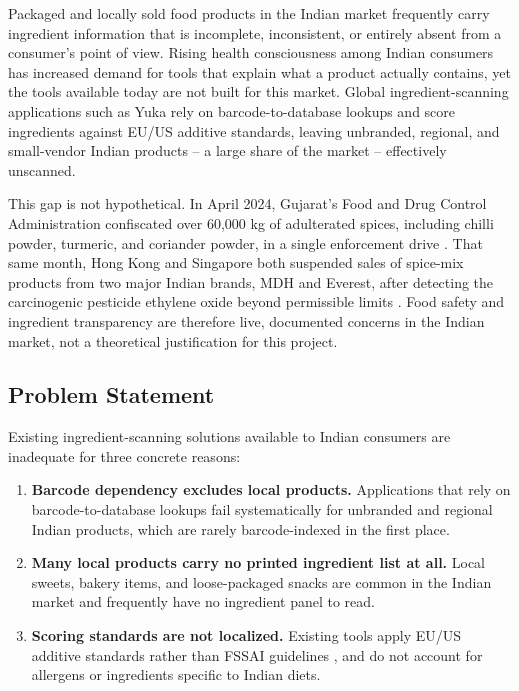 \documentclass{report}
\begin{document}
Packaged and locally sold food products in the Indian market frequently
carry ingredient information that is incomplete, inconsistent, or entirely
absent from a consumer's point of view. Rising health consciousness among
Indian consumers has increased demand for tools that explain what a
product actually contains, yet the tools available today are not built
for this market. Global ingredient-scanning applications such as Yuka
\cite{yuka} rely on barcode-to-database lookups and score ingredients
against EU/US additive standards, leaving unbranded, regional, and
small-vendor Indian products -- a large share of the market -- effectively
unscanned.

This gap is not hypothetical. In April 2024, Gujarat's Food and Drug
Control Administration confiscated over 60,000 kg of adulterated spices,
including chilli powder, turmeric, and coriander powder, in a single
enforcement drive \cite{gujaratspiceseizure}. That same month, Hong Kong
and Singapore both suspended sales of spice-mix products from two major
Indian brands, MDH and Everest, after detecting the carcinogenic
pesticide ethylene oxide beyond permissible limits \cite{mdheverestban}.
Food safety and ingredient transparency are therefore live, documented
concerns in the Indian market, not a theoretical justification for this
project.

\subsection{Problem Statement}

Existing ingredient-scanning solutions available to Indian consumers are
inadequate for three concrete reasons:

\begin{enumerate}
  \item \textbf{Barcode dependency excludes local products.} Applications
    that rely on barcode-to-database lookups fail systematically for
    unbranded and regional Indian products, which are rarely
    barcode-indexed in the first place.
  \item \textbf{Many local products carry no printed ingredient list at
    all.} Local sweets, bakery items, and loose-packaged snacks are
    common in the Indian market and frequently have no ingredient panel
    to read.
  \item \textbf{Scoring standards are not localized.} Existing tools
    apply EU/US additive standards rather than FSSAI guidelines
    \cite{fssaicompendium}, and do not account for allergens or
    ingredients specific to Indian diets.
\end{enumerate}
\end{document}
